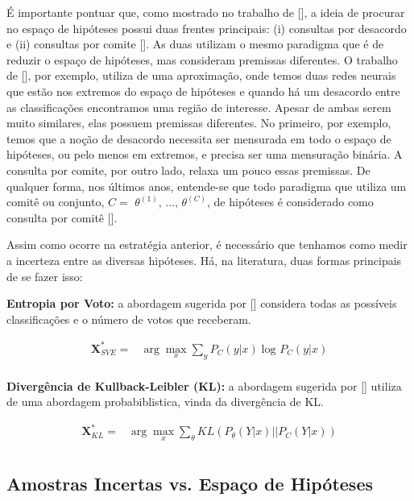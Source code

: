 É importante pontuar que, como mostrado no trabalho de [\cite{settles2014active}], a ideia de procurar no espaço de hipóteses possui duas frentes principais: (i) consultas por desacordo e (ii) consultas por comite [\cite{seung1992query}]. As duas utilizam o mesmo paradigma que é de reduzir o espaço de hipóteses, mas consideram premissas diferentes. O trabalho de [\cite{cohn1994improving}], por exemplo, utiliza de uma aproximação, onde temos duas redes neurais que estão nos extremos do espaço de hipóteses e quando há um desacordo entre as classificações encontramos uma região de interesse. Apesar de ambas serem muito similares, elas possuem premissas diferentes. No primeiro, por exemplo, temos que a noção de desacordo necessita ser mensurada em todo o espaço de hipóteses, ou pelo menos em extremos, e precisa ser uma mensuração binária. A consulta por comite, por outro lado, relaxa um pouco essas premissas. De qualquer forma, nos últimos anos, entende-se que todo paradigma que utiliza um comitê ou conjunto, $C =$ { $\theta^{(1)}$, ..., $\theta^{(C)}$}, de hipóteses é considerado como consulta por comitê [\cite{settles2012active, settles2014active}].


Assim como ocorre na estratégia anterior, é necessário que tenhamos como medir a incerteza entre as diversas hipóteses. Há, na literatura, duas formas principais de se fazer isso: 

\textbf{Entropia por Voto:} a abordagem sugerida por [\cite{dagan1995committee}] considera todas as possíveis classificações e o número de votos que receberam. 

\begin{align*}
\textbf{X}^*_{SVE} = &\arg\max_{x} \sum_{y} P_{C}  (y\lvert x) \log_{} P_{C}  (y\lvert x)\\
\end{align*}

\textbf{Divergência de Kullback-Leibler (KL):} a abordagem sugerida por [\cite{mccallumzy1998employing}] utiliza de uma abordagem probabiblistica, vinda da divergência de KL.

\begin{align*}
\textbf{X}^*_{KL} = &\arg\max_{x} \sum_{\theta} KL(  P_{\theta} (Y\lvert x) \lvert\lvert P_{C} (Y\lvert x))\\
\end{align*}


\subsection{Amostras Incertas vs. Espaço de Hipóteses} 
\label{sec:minimizing_expected}


